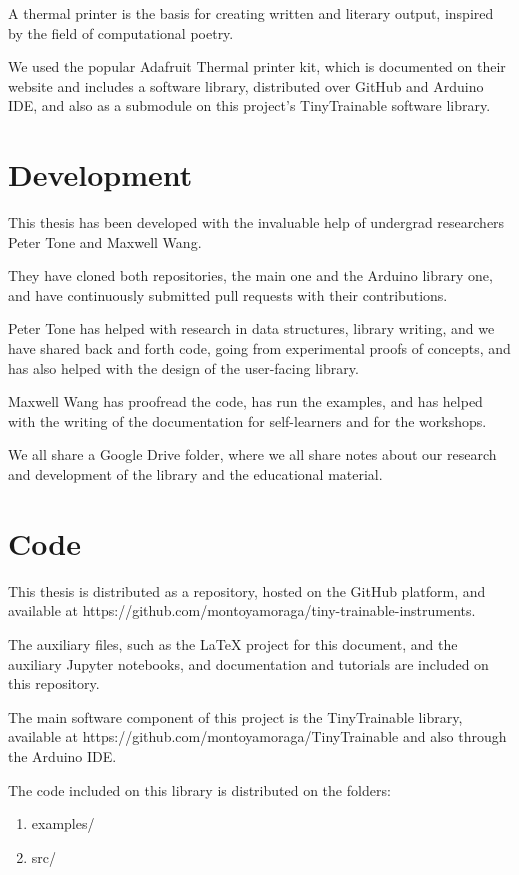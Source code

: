 A thermal printer is the basis for creating written and literary output, inspired by the field of computational poetry.

We used the popular Adafruit Thermal printer kit, which is documented on their website and includes a software library, distributed over GitHub and Arduino IDE, and also as a submodule on this project's TinyTrainable software library.

\section{Development}

This thesis has been developed with the invaluable help of undergrad researchers Peter Tone and Maxwell Wang.

They have cloned both repositories, the main one and the Arduino library one, and have continuously submitted pull requests with their contributions.

Peter Tone has helped with research in data structures, library writing, and we have shared back and forth code, going from experimental proofs of concepts, and has also helped with the design of the user-facing library.

Maxwell Wang has proofread the code, has run the examples, and has helped with the writing of the documentation for self-learners and for the workshops.

We all share a Google Drive folder, where we all share notes about our research and development of the library and the educational material.

\section{Code}

This thesis is distributed as a repository, hosted on the GitHub platform, and available at https://github.com/montoyamoraga/tiny-trainable-instruments.

The auxiliary files, such as the LaTeX project for this document, and the auxiliary Jupyter notebooks, and documentation and tutorials are included on this repository.

The main software component of this project is the TinyTrainable library, available at https://github.com/montoyamoraga/TinyTrainable and also through the Arduino IDE.

The code included on this library is distributed on the folders:

\begin{enumerate}
  \item examples/
  \item src/
\end{enumerate}

